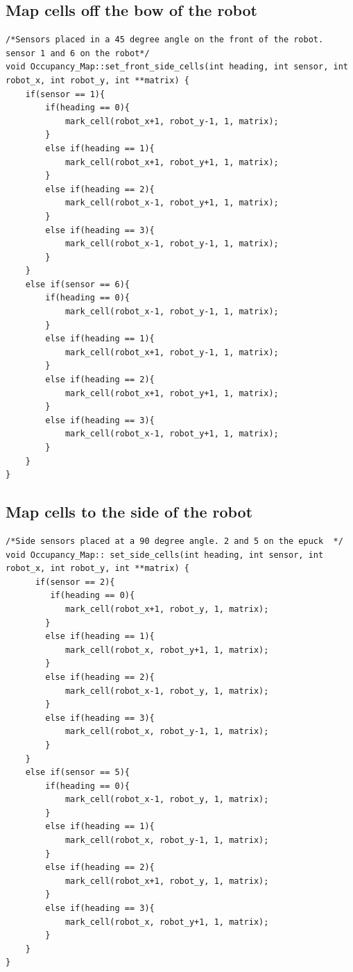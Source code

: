 \subsection{Map cells off the bow of the robot}
\label{code:set_bow}

\begin{lstlisting}[caption = {Code to set cells off the bow of the robot}]
/*Sensors placed in a 45 degree angle on the front of the robot. sensor 1 and 6 on the robot*/
void Occupancy_Map::set_front_side_cells(int heading, int sensor, int robot_x, int robot_y, int **matrix) {
    if(sensor == 1){
        if(heading == 0){
            mark_cell(robot_x+1, robot_y-1, 1, matrix);
        }
        else if(heading == 1){
            mark_cell(robot_x+1, robot_y+1, 1, matrix);
        }
        else if(heading == 2){
            mark_cell(robot_x-1, robot_y+1, 1, matrix);
        }
        else if(heading == 3){
            mark_cell(robot_x-1, robot_y-1, 1, matrix);
        }
    }
    else if(sensor == 6){
        if(heading == 0){
            mark_cell(robot_x-1, robot_y-1, 1, matrix);
        }
        else if(heading == 1){
            mark_cell(robot_x+1, robot_y-1, 1, matrix);
        }
        else if(heading == 2){
            mark_cell(robot_x+1, robot_y+1, 1, matrix);
        }
        else if(heading == 3){
            mark_cell(robot_x-1, robot_y+1, 1, matrix);
        }
    }
}
\end{lstlisting}

\subsection{Map cells to the side of the robot}
\label{code:set_side}

\begin{lstlisting}[caption = {Code to set cells of the sides of the robot}]
/*Side sensors placed at a 90 degree angle. 2 and 5 on the epuck  */
void Occupancy_Map:: set_side_cells(int heading, int sensor, int robot_x, int robot_y, int **matrix) {
      if(sensor == 2){
         if(heading == 0){
            mark_cell(robot_x+1, robot_y, 1, matrix);
        }
        else if(heading == 1){
            mark_cell(robot_x, robot_y+1, 1, matrix);
        }
        else if(heading == 2){
            mark_cell(robot_x-1, robot_y, 1, matrix);
        }
        else if(heading == 3){
            mark_cell(robot_x, robot_y-1, 1, matrix);
        }
    }
    else if(sensor == 5){
        if(heading == 0){
            mark_cell(robot_x-1, robot_y, 1, matrix);
        }
        else if(heading == 1){
            mark_cell(robot_x, robot_y-1, 1, matrix);
        }
        else if(heading == 2){
            mark_cell(robot_x+1, robot_y, 1, matrix);
        }
        else if(heading == 3){
            mark_cell(robot_x, robot_y+1, 1, matrix);
        }
    }
}
\end{lstlisting}

